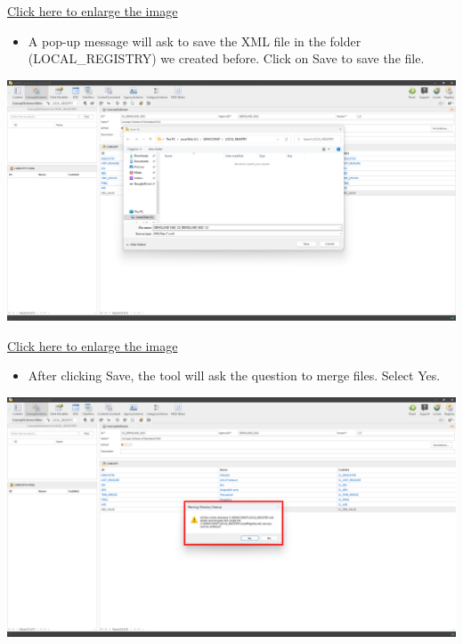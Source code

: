 \documentclass[
]{book}
\providecommand{\tightlist}{%
  \setlength{\itemsep}{0pt}\setlength{\parskip}{0pt}}
\theoremstyle{definition}
\theoremstyle{definition}
\theoremstyle{definition}
\theoremstyle{definition}
\theoremstyle{remark}
\begin{document}
\href{images/image118.png}{Click here to enlarge the image}

\begin{itemize}
\tightlist
\item
  A pop-up message will ask to save the XML file in the folder (LOCAL\_REGISTRY) we created before. Click on Save to save the file.
\end{itemize}

\begin{center}\includegraphics[width=1\linewidth]{./images/image123} \end{center}

\href{images/image123.png}{Click here to enlarge the image}

\begin{itemize}
\tightlist
\item
  After clicking Save, the tool will ask the question to merge files. Select Yes.
\end{itemize}

\begin{center}\includegraphics[width=1\linewidth]{./images/image125} \end{center}
\end{document}
